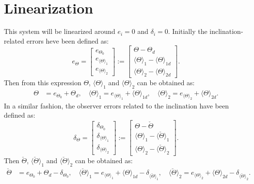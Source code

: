\documentclass[../main.tex]{subfiles}
\begin{document}
	\section{Linearization}
	This system will be linearized around $e_i = 0$ and $\delta_i = 0$. Initially the inclination-related errors heve been defined as:
	\begin{equation}
	e_\Theta = \begin{bmatrix}
	e_{\Theta_0} \\
	e_{\langle \Theta \rangle_1} \\
	e_{\langle \Theta \rangle_2}
	\end{bmatrix} := \begin{bmatrix}
	\Theta - \Theta_d \\
	\langle \Theta \rangle_1 - \langle \Theta \rangle_{1d} \\
	\langle \Theta \rangle_2 - \langle \Theta \rangle_{2d} 
	\end{bmatrix}.
	\end{equation}
	Then from this expression $\Theta$, $\langle \Theta \rangle_1$ and $\langle \Theta \rangle_2 $ can be obtained as:
	\begin{align}
	\Theta &= e_{\Theta_0} + \Theta_d,\quad \langle \Theta \rangle_1 = e_{\langle \Theta \rangle_1} + \langle \Theta \rangle_{1d},\quad \langle \Theta \rangle_2 = e_{\langle \Theta \rangle_2} + \langle \Theta \rangle_{2d}.
	\label{eq:theta}
	\end{align}
	In a similar fashion, the observer errors related to the inclination have been defined as:
	\begin{equation}
	\delta_\Theta = \begin{bmatrix}
	\delta_{\Theta_0} \\
	\delta_{\langle \Theta \rangle_1} \\
	\delta_{\langle \Theta \rangle_2}
	\end{bmatrix} := \begin{bmatrix}
	\Theta - \check{\Theta} \\
	\langle \Theta \rangle_1 - \langle \check{\Theta} \rangle_{1} \\
	\langle \Theta \rangle_2 - \langle \check{\Theta} \rangle_{2} 
	\end{bmatrix}.
	\label{eq:observererror}
	\end{equation}
	Then $\check{\Theta}$, $\langle \check{\Theta} \rangle_{1}$ and $\langle \check{\Theta} \rangle_{2}$ can be obtained as:
	\begin{align}
	\check{\Theta} &= e_{\Theta_0} + \Theta_d - \delta_{\Theta_0}, \quad \langle \check{\Theta} \rangle_{1} = e_{\langle \Theta \rangle_1} + \langle \Theta \rangle_{1d} - \delta_{\langle \check{\Theta} \rangle_{1}}, \quad \langle \check{\Theta} \rangle_{2} = e_{\langle \Theta \rangle_2} + \langle \Theta \rangle_{2d} - \delta_{\langle \check{\Theta} \rangle_{2}}
	\label{eq:esttheta}.
	\end{align}
\end{document}
